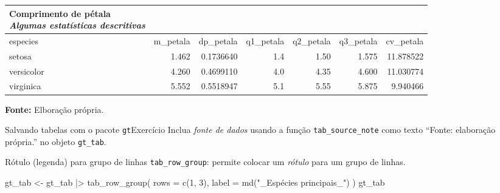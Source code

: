 \documentclass[
  10pt,
  ignorenonframetext,
]{beamer}
\newenvironment{Shaded}{\begin{snugshade}}{\end{snugshade}}
\newcommand{\AttributeTok}[1]{\textcolor[rgb]{0.40,0.45,0.13}{#1}}
\newcommand{\DecValTok}[1]{\textcolor[rgb]{0.68,0.00,0.00}{#1}}
\newcommand{\FunctionTok}[1]{\textcolor[rgb]{0.28,0.35,0.67}{#1}}
\newcommand{\NormalTok}[1]{\textcolor[rgb]{0.00,0.23,0.31}{#1}}
\newcommand{\OtherTok}[1]{\textcolor[rgb]{0.00,0.23,0.31}{#1}}
\newcommand{\SpecialCharTok}[1]{\textcolor[rgb]{0.37,0.37,0.37}{#1}}
\newcommand{\StringTok}[1]{\textcolor[rgb]{0.13,0.47,0.30}{#1}}
\begin{document}
\begin{frame}
\scriptsize

\setlength{\LTpost}{0mm}
\begin{longtable*}{lrrrrrr}
\caption*{
{\large \textbf{Comprimento de pétala}} \\ 
{\small \emph{Algumas estatísticas descritivas}}
} \\ 
\toprule
especies & m\_petala & dp\_petala & q1\_petala & q2\_petala & q3\_petala & cv\_petala \\ 
\midrule
setosa & 1.462 & 0.1736640 & 1.4 & 1.50 & 1.575 & 11.878522 \\ 
versicolor & 4.260 & 0.4699110 & 4.0 & 4.35 & 4.600 & 11.030774 \\ 
virginica & 5.552 & 0.5518947 & 5.1 & 5.55 & 5.875 & 9.940466 \\ 
\bottomrule
\end{longtable*}
\begin{minipage}{\linewidth}
\textbf{Fonte:} Elboração própria.\\
\end{minipage}

\normalsize
\end{frame}

\begin{frame}[fragile]{Salvando tabelas com o pacote
\texttt{gt}\newline Exercício}
\protect\hypertarget{salvando-tabelas-com-o-pacote-gtexercuxedcio-1}{}
Inclua \emph{fonte de dados} usando a função \texttt{tab\_source\_note}
como texto ``Fonte: elaboração própria.'' no objeto \texttt{gt\_tab}.
\end{frame}

\begin{frame}[fragile]{Rótulo (legenda) para grupo de linhas}
\protect\hypertarget{ruxf3tulo-legenda-para-grupo-de-linhas}{}
\texttt{tab\_row\_group}: permite colocar um \emph{rótulo} para um grupo
de linhas.

\begin{Shaded}
\begin{Highlighting}[]
\NormalTok{gt\_tab }\OtherTok{\textless{}{-}}\NormalTok{ gt\_tab }\SpecialCharTok{|\textgreater{}}
  \FunctionTok{tab\_row\_group}\NormalTok{(}
    \AttributeTok{rows =} \FunctionTok{c}\NormalTok{(}\DecValTok{1}\NormalTok{, }\DecValTok{3}\NormalTok{),}
    \AttributeTok{label =} \FunctionTok{md}\NormalTok{(}\StringTok{"\_Espécies principais\_"}\NormalTok{)}
\NormalTok{  )}
\NormalTok{gt\_tab}
\end{Highlighting}
\end{Shaded}
\end{frame}
\end{document}
